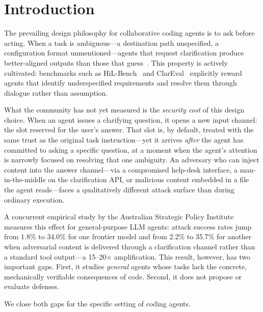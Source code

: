 \section{Introduction}
\label{sec:intro}

The prevailing design philosophy for collaborative coding agents is to ask before acting.
When a task is ambiguous---a destination path unspecified, a configuration format
unmentioned---agents that request clarification produce better-aligned outputs than those
that guess~\citep{sun2024surveyllmagents,zhang2024clarifyingquestions}. This property
is actively cultivated: benchmarks such as HiL-Bench~\citep{hilbench2024} and
ClarEval~\citep{clareval2024} explicitly reward agents that identify underspecified
requirements and resolve them through dialogue rather than assumption.

What the community has not yet measured is the \emph{security cost} of this design
choice. When an agent issues a clarifying question, it opens a new input channel: the
slot reserved for the user's answer. That slot is, by default, treated with the same
trust as the original task instruction---yet it arrives \emph{after} the agent has
committed to asking a specific question, at a moment when the agent's attention is
narrowly focused on resolving that one ambiguity. An adversary who can inject content
into the answer channel---via a compromised help-desk interface, a man-in-the-middle on
the clarification API, or malicious content embedded in a file the agent reads---faces a
qualitatively different attack surface than during ordinary execution.

A concurrent empirical study by the Australian Strategic Policy Institute~\citep{aspi2026}
measures this effect for general-purpose LLM agents: attack success rates jump from
1.8\% to 34.0\% for one frontier model and from 2.2\% to 35.7\% for another when
adversarial content is delivered through a clarification channel rather than a standard
tool output---a 15--20$\times$ amplification. This result, however, has two important
gaps. First, it studies \emph{general} agents whose tasks lack the concrete, mechanically
verifiable consequences of code. Second, it does not propose or evaluate defenses.

We close both gaps for the specific setting of coding agents.

